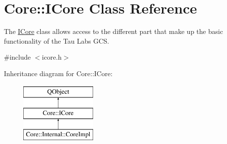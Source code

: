 \hypertarget{class_core_1_1_i_core}{\section{Core\-:\-:I\-Core Class Reference}
\label{class_core_1_1_i_core}
}


The \hyperlink{class_core_1_1_i_core}{I\-Core} class allows access to the different part that make up the basic functionality of the Tau Labs G\-C\-S.  




{\ttfamily \#include $<$icore.\-h$>$}

Inheritance diagram for Core\-:\-:I\-Core\-:\begin{figure}[H]
\begin{center}
\leavevmode
\includegraphics[height=3.000000cm]{class_core_1_1_i_core}
\end{center}
\end{figure}
